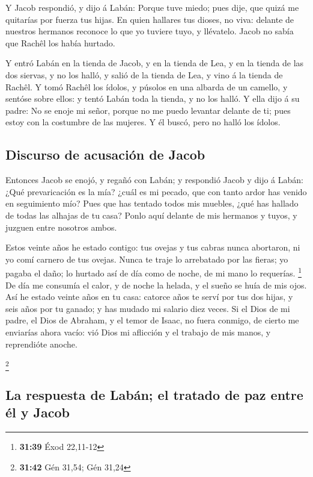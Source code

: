  Y Jacob respondió, y dijo á Labán: Porque tuve miedo; pues
dije, que quizá me quitarías por fuerza tus hijas.  En
quien hallares tus dioses, no viva: delante de nuestros hermanos
reconoce lo que yo tuviere tuyo, y llévatelo. Jacob no sabía que Rachêl
los había hurtado.

 Y entró Labán en la tienda de Jacob, y en la tienda de
Lea, y en la tienda de las dos siervas, y no los halló, y salió de la
tienda de Lea, y vino á la tienda de Rachêl.  Y tomó Rachêl
los ídolos, y púsolos en una albarda de un camello, y sentóse sobre
ellos: y tentó Labán toda la tienda, y no los halló.  Y
ella dijo á su padre: No se enoje mi señor, porque no me puedo levantar
delante de ti; pues estoy con la costumbre de las mujeres. Y él buscó,
pero no halló los ídolos.

\hypertarget{discurso-de-acusaciuxf3n-de-jacob}{%
\subsection{Discurso de acusación de
Jacob}\label{discurso-de-acusaciuxf3n-de-jacob}}

 Entonces Jacob se enojó, y regañó con Labán; y respondió
Jacob y dijo á Labán: ¿Qué prevaricación es la mía? ¿cuál es mi pecado,
que con tanto ardor has venido en seguimiento mío?  Pues
que has tentado todos mis muebles, ¿qué has hallado de todas las alhajas
de tu casa? Ponlo aquí delante de mis hermanos y tuyos, y juzguen entre
nosotros ambos.

 Estos veinte años he estado contigo: tus ovejas y tus
cabras nunca abortaron, ni yo comí carnero de tus ovejas. 
Nunca te traje lo arrebatado por las fieras; yo pagaba el daño; lo
hurtado así de día como de noche, de mi mano lo requerías. \footnote{\textbf{31:39}
  Éxod 22,11-12}  De día me consumía el calor, y de noche
la helada, y el sueño se huía de mis ojos.  Así he estado
veinte años en tu casa: catorce años te serví por tus dos hijas, y seis
años por tu ganado; y has mudado mi salario diez veces.  Si
el Dios de mi padre, el Dios de Abraham, y el temor de Isaac, no fuera
conmigo, de cierto me enviarías ahora vacío: vió Dios mi aflicción y el
trabajo de mis manos, y reprendióte anoche.

\footnote{\textbf{31:42} Gén 31,54; Gén 31,24}

\hypertarget{la-respuesta-de-labuxe1n-el-tratado-de-paz-entre-uxe9l-y-jacob}{%
\subsection{La respuesta de Labán; el tratado de paz entre él y
Jacob}\label{la-respuesta-de-labuxe1n-el-tratado-de-paz-entre-uxe9l-y-jacob}}

